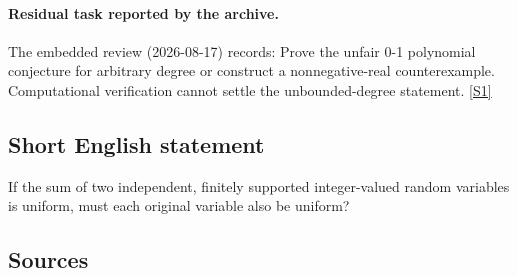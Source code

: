 \documentclass[11pt,a4paper]{article}
\newcommand{\sref}[2]{\hyperlink{source:#1:#2}{[S#2]}}
\begin{document}
\paragraph{Residual task reported by the archive.}

The embedded review (2026-08-17) records: Prove the unfair 0-1 polynomial conjecture for arbitrary degree or construct a nonnegative-real counterexample. Computational verification cannot settle the unbounded-degree statement. \sref{159}{1}

\subsection{Short English statement}

If the sum of two independent, finitely supported integer-valued random variables is uniform, must each original variable also be uniform?

\subsection{Sources}
\end{document}
